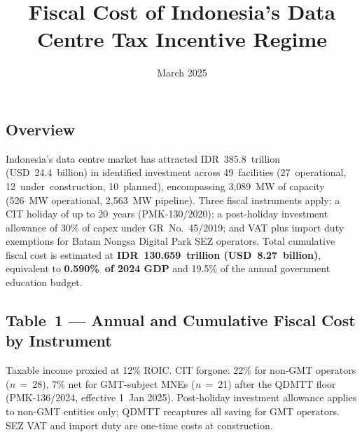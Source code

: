 \documentclass[11pt,english]{article}
\begin{document}
\vspace{-2cm}
\title{\textbf{Fiscal Cost of Indonesia's Data Centre Tax Incentive Regime}}
\author{}
\date{March 2025}
\maketitle

\subsection*{Overview}
Indonesia's data centre market has attracted IDR~385.8~trillion (USD~24.4~billion) in identified investment across 49~facilities (27~operational, 12~under~construction, 10~planned), encompassing 3{,}089~MW of capacity (526~MW operational, 2{,}563~MW pipeline). Three fiscal instruments apply: a CIT holiday of up to 20~years (PMK-130/2020); a post-holiday investment allowance of 30\% of capex under GR~No.~45/2019; and VAT plus import duty exemptions for Batam Nongsa Digital Park SEZ operators. Total cumulative fiscal cost is estimated at \textbf{IDR~130.659~trillion (USD~8.27~billion)}, equivalent to \textbf{0.590\%~of 2024 GDP} and 19.5\% of the annual government education budget.

\subsection*{Table~1 \texorpdfstring{---}{--} Annual and Cumulative Fiscal Cost by Instrument}

Taxable income proxied at 12\% ROIC. CIT forgone: 22\% for non-GMT operators (\textit{n}~=~28), 7\% net for GMT-subject MNEs (\textit{n}~=~21) after the QDMTT floor (PMK-136/2024, effective 1~Jan 2025). Post-holiday investment allowance applies to non-GMT entities only; QDMTT recaptures all saving for GMT operators. SEZ VAT and import duty are one-time costs at construction.
\end{document}
